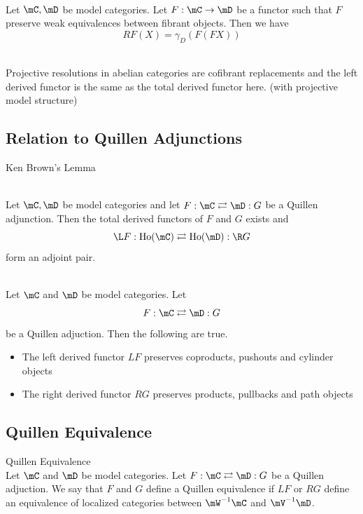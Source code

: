 \documentclass[a4paper]{article}
\begin{document}
\begin{prp}{}{}\\
Let $\mC,\mD$ be model categories. Let $F:\mC\to\mD$ be a functor such that $F$ preserve weak equivalences between fibrant objects. Then we have $$RF(X)=\gamma_D(F(FX))$$
\end{prp}

\begin{eg}{}{}\\
Projective resolutions in abelian categories are cofibrant replacements and the left derived functor is the same as the total derived functor here. (with projective model structure)
\end{eg}

\subsection{Relation to Quillen Adjunctions}
\begin{thm}{Ken Brown's Lemma}{}
\end{thm}

\begin{prp}{}{}\\ Let $\mC,\mD$ be model categories and let $F:\mC\rightleftarrows\mD:G$ be a Quillen adjunction. Then the total derived functors of $F$ and $G$ exists and $$\L F:\text{Ho}(\mC)\rightleftarrows\text{Ho}(\mD):\R G$$ form an adjoint pair. 
\end{prp}

\begin{prp}{}{}\\ Let $\mC$ and $\mD$ be model categories. Let $$F:\mC\rightleftarrows\mD:G$$ be a Quillen adjuction. Then the following are true. 
\begin{itemize}
\item The left derived functor $LF$ preserves coproducts, pushouts and cylinder objects
\item The right derived functor $RG$ preserves products, pullbacks and path objects
\end{itemize}
\end{prp}

\subsection{Quillen Equivalence}
\begin{defn}{Quillen Equivalence}{}\\ Let $\mC$ and $\mD$ be model categories. Let $F:\mC\rightleftarrows\mD:G$ be a Quillen adjuction. We say that $F$ and $G$ define a Quillen equivalence if $LF$ or $RG$ define an equivalence of localized categories between $\mW^{-1}\mC$ and $\mV^{-1}\mD$. 
\end{defn}
\end{document}

